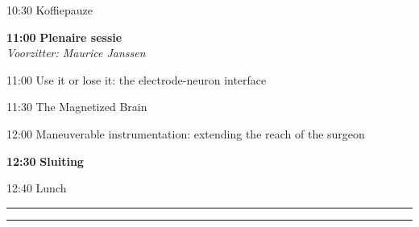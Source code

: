 \documentclass[a4paper,10pt]{report}
\begin{document}
\begin{multicols*}{3}
\begin{packed_enum}
\item[{\color{Blue}{\textbf{09:00}}}]{ }
        \vfill
\item[10:30] Koffiepauze
        \vfill
\item[\textbf{11:00}] {\textbf{Plenaire sessie}}\\\textit{Voorzitter: Maurice Janssen}
\item[11:00] Use it or lose it: the electrode-neuron interface
\item[11:30] The Magnetized Brain
\item[12:00] Maneuverable instrumentation: extending the reach of the surgeon
        \vfill
\item[\textbf{12:30}] \textbf{Sluiting}
\vfill
\item[12:40] Lunch
\end{packed_enum}%


\columnbreak



\vfill
\columnbreak

\hrule \vspace{2mm}
\vspace{2mm}\hrule\strut
\vfill



\end{multicols*}
\end{document}
